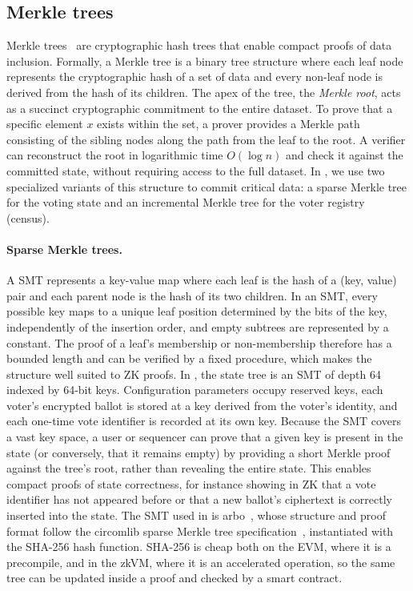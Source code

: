 \subsection{Merkle trees}
\label{sec:background:mt}

Merkle trees~\cite{merkle1987digital} are cryptographic hash trees that enable compact proofs of data inclusion. Formally, a Merkle tree is a binary tree structure where each leaf node represents the cryptographic hash of a set of data and every non-leaf node is derived from the hash of its children. The apex of the tree, the \textit{Merkle root}, acts as a succinct cryptographic commitment to the entire dataset.
To prove that a specific element $x$ exists within the set, a prover provides a Merkle path consisting of the sibling nodes along the path from the leaf to the root. A verifier can reconstruct the root in logarithmic time $O(\log n)$ and check it against the committed state, without requiring access to the full dataset. In \davinci, we use two specialized variants of this structure to commit critical data: a sparse Merkle tree for the voting state and an incremental Merkle tree for the voter registry (census).

\paragraph{Sparse Merkle trees.}

A \ac{SMT} represents a key-value map where each leaf is the hash of a (key, value) pair and each parent node is the hash of its two children. In an \ac{SMT}, every possible key maps to a unique leaf position determined by the bits of the key, independently of the insertion order, and empty subtrees are represented by a constant. The proof of a leaf's membership or non-membership therefore has a bounded length and can be verified by a fixed procedure, which makes the structure well suited to \ac{ZK} proofs. In \davinci, the state tree is an \ac{SMT} of depth 64 indexed by 64-bit keys. Configuration parameters occupy reserved keys, each voter's encrypted ballot is stored at a key derived from the voter's identity, and each one-time vote identifier is recorded at its own key. Because the \ac{SMT} covers a vast key space, a user or sequencer can prove that a given key is present in the state (or conversely, that it remains empty) by providing a short Merkle proof against the tree's root, rather than revealing the entire state. This enables compact proofs of state correctness, for instance showing in \ac{ZK} that a vote identifier has not appeared before or that a new ballot's ciphertext is correctly inserted into the state. The \ac{SMT} used in \davinci is arbo~\cite{arbo}, whose structure and proof format follow the circomlib sparse Merkle tree specification~\cite{baylina2019sparse}, instantiated with the SHA-256 hash function. SHA-256 is cheap both on the \ac{EVM}, where it is a precompile, and in the \ac{zkVM}, where it is an accelerated operation, so the same tree can be updated inside a proof and checked by a smart contract.


